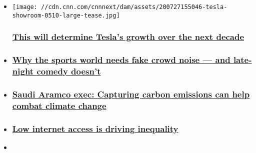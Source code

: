 \begin{itemize}
\item
  \href{/2020/07/29/perspectives/tesla-competition-elon-musk-leadership/index.html}{}

  \texttt{[image: //cdn.cnn.com/cnnnext/dam/assets/200727155046-tesla-showroom-0510-large-tease.jpg]}

  \hypertarget{this-will-determine-teslas-growth-over-the-next-decade}{%
  \subsubsection{\texorpdfstring{\href{/2020/07/29/perspectives/tesla-competition-elon-musk-leadership/index.html}{This
  will determine Tesla's growth over the next
  decade}}{This will determine Tesla's growth over the next decade}}\label{this-will-determine-teslas-growth-over-the-next-decade}}
\item
  \hypertarget{why-the-sports-world-needs-fake-crowd-noise--and-late-night-comedy-doesnt}{%
  \subsubsection{\texorpdfstring{\href{/2020/07/23/perspectives/sports-late-night-comedy-crowd-noise/index.html}{Why
  the sports world needs fake crowd noise --- and late-night comedy
  doesn't}}{Why the sports world needs fake crowd noise --- and late-night comedy doesn't}}\label{why-the-sports-world-needs-fake-crowd-noise--and-late-night-comedy-doesnt}}
\item
  \hypertarget{saudi-aramco-exec-capturing-carbon-emissions-can-help-combat-climate-change}{%
  \subsubsection{\texorpdfstring{\href{/2020/06/10/perspectives/carbon-capture-saudi-aramco/index.html}{Saudi
  Aramco exec: Capturing carbon emissions can help combat climate
  change}}{Saudi Aramco exec: Capturing carbon emissions can help combat climate change}}\label{saudi-aramco-exec-capturing-carbon-emissions-can-help-combat-climate-change}}
\item
  \hypertarget{low-internet-access-is-driving-inequality}{%
  \subsubsection{\texorpdfstring{\href{/2020/07/05/perspectives/internet-access-inequality/index.html}{Low
  internet access is driving
  inequality}}{Low internet access is driving inequality}}\label{low-internet-access-is-driving-inequality}}
\item
  \hypertarget{i-wrote-this-law-to-protect-free-speech-now-trump-wants-to-revoke-it}{%
}
\end{itemize}
